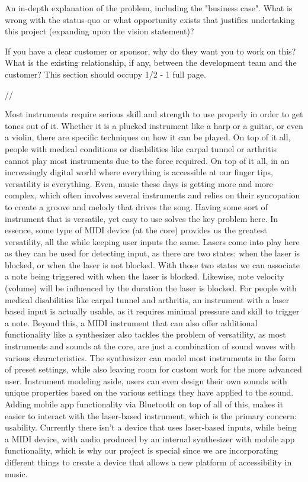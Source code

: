 An in-depth explanation of the problem, including the "business case". What is wrong with the status-quo or what opportunity exists that justifies undertaking this project (expanding upon the vision statement)?

If you have a clear customer or sponsor, why do they want you to work on this? What is the existing relationship, if any, between the development team and the customer? This section should occupy 1/2 - 1 full page.

//

Most instruments require serious skill and strength to use properly in order to get tones out of it. Whether it is a plucked instrument like a harp or a guitar, or even a violin, there are specific techniques on how it can be played. On top of it all, people with medical conditions or disabilities like carpal tunnel or arthritis cannot play most instruments due to the force required. On top of it all, in an increasingly digital world where everything is accessible at our finger tips, versatility is everything. Even, music these days is getting more and more complex,  which often involves several instruments and relies on their syncopation to create a groove and melody that drives the song. Having some sort of instrument that is versatile, yet easy to use solves the key problem here. In essence, some type of MIDI device (at the core) provides us the greatest versatility, all the while keeping user inputs the same. Lasers come into play here as they can be used for detecting input, as there are two states: when the laser is blocked, or when the laser is not blocked. With those two states we can associate a note being triggered with when the laser is blocked. Likewise, note velocity (volume) will be influenced by the duration the laser is blocked. For people with medical disabilities like carpal tunnel and arthritis, an instrument with a laser based input is actually usable, as it requires minimal pressure and skill to trigger a note. Beyond this, a MIDI instrument that can also offer additional functionality like a synthesizer also tackles the problem of versatility, as most instruments and sounds at the core, are just a combination of sound waves with various characteristics. The synthesizer can model most instruments in the form of preset settings, while also leaving room for custom work for the more advanced user. Instrument modeling aside, users can even design their own sounds with unique properties based on the various settings they have applied to the sound. Adding mobile app functionality via Bluetooth on top of all of this, makes it easier to interact with the laser-based instrument, which is the primary concern: usability. Currently there isn’t a device that uses laser-based inputs, while being a MIDI device, with audio produced by an internal synthesizer with mobile app functionality, which is why our project is special since we are incorporating different things to create a device that allows a new platform of accessibility in music.
